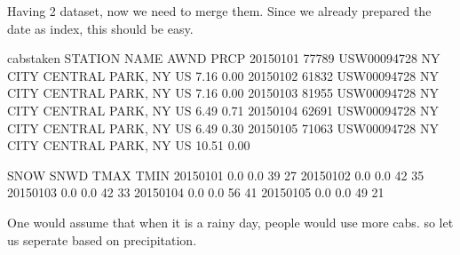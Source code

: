 \documentclass[letterpaper,10pt,english]{jupyterBook}
\begin{document}
\sphinxAtStartPar
Having 2 dataset, now we need to merge them. Since we already prepared the date as index, this should be easy.

\begin{sphinxVerbatim}[commandchars=\\\{\}]
     
\end{sphinxVerbatim}

\begin{sphinxVerbatim}[commandchars=\\\{\}]
\end{sphinxVerbatim}

\begin{sphinxVerbatim}[commandchars=\\\{\}]
            cabs\PYGZus{}taken      STATION                         NAME   AWND  PRCP  \PYGZbs{}
2015\PYGZhy{}01\PYGZhy{}01       77789  USW00094728  NY CITY CENTRAL PARK, NY US   7.16  0.00   
2015\PYGZhy{}01\PYGZhy{}02       61832  USW00094728  NY CITY CENTRAL PARK, NY US   7.16  0.00   
2015\PYGZhy{}01\PYGZhy{}03       81955  USW00094728  NY CITY CENTRAL PARK, NY US   6.49  0.71   
2015\PYGZhy{}01\PYGZhy{}04       62691  USW00094728  NY CITY CENTRAL PARK, NY US   6.49  0.30   
2015\PYGZhy{}01\PYGZhy{}05       71063  USW00094728  NY CITY CENTRAL PARK, NY US  10.51  0.00   

            SNOW  SNWD  TMAX  TMIN  
2015\PYGZhy{}01\PYGZhy{}01   0.0   0.0    39    27  
2015\PYGZhy{}01\PYGZhy{}02   0.0   0.0    42    35  
2015\PYGZhy{}01\PYGZhy{}03   0.0   0.0    42    33  
2015\PYGZhy{}01\PYGZhy{}04   0.0   0.0    56    41  
2015\PYGZhy{}01\PYGZhy{}05   0.0   0.0    49    21  
\end{sphinxVerbatim}

\sphinxAtStartPar
One would assume that when it is a rainy day, people would use more cabs. so let us seperate based on precipitation.

\begin{sphinxVerbatim}[commandchars=\\\{\}]
  \PYG{p}{[}\PYG{p}{[}\PYG{p}{]}\PYG{p}{]}
  \PYG{p}{[}\PYG{p}{[}\PYG{p}{]}\PYG{p}{]}
\end{sphinxVerbatim}
\end{document}
